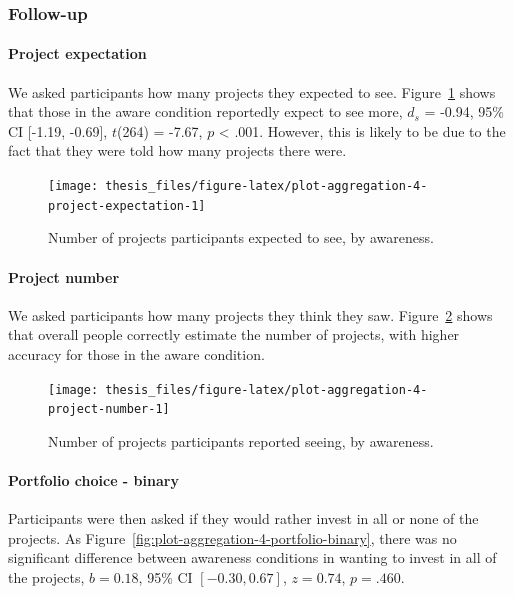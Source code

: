 \documentclass[a4paper, nobind, dvipsnames]{templates/ociamthesis}
\theoremstyle{definition}
\theoremstyle{definition}
\theoremstyle{definition}
\theoremstyle{definition}
\theoremstyle{remark}
\begin{document}
\subsubsection{Follow-up}

\paragraph{Project expectation}

We asked participants how many projects they expected to see.
Figure~\ref{fig:plot-aggregation-4-project-expectation} shows that those in
the aware condition reportedly expect to see more,
\(d_s\) = -0.94, 95\% CI {[}-1.19, -0.69{]}, \(t\)(264) = -7.67, \(p\) \textless{} .001. However, this is likely to be due to
the fact that they were told how many projects there were.



\begin{figure}
\texttt{[image: thesis\_files/figure-latex/plot-aggregation-4-project-expectation-1]} \caption{Number of projects participants expected to see, by awareness.}\label{fig:plot-aggregation-4-project-expectation}
\end{figure}

\paragraph{Project number}

We asked participants how many projects they think they saw.
Figure~\ref{fig:plot-aggregation-4-project-number} shows that overall people
correctly estimate the number of projects, with higher accuracy for those in the
aware condition.



\begin{figure}
\texttt{[image: thesis\_files/figure-latex/plot-aggregation-4-project-number-1]} \caption{Number of projects participants reported seeing, by awareness.}\label{fig:plot-aggregation-4-project-number}
\end{figure}

\paragraph{Portfolio choice - binary}

Participants were then asked if they would rather invest in all or none of the
projects. As Figure~\ref{fig:plot-aggregation-4-portfolio-binary}, there was no
significant difference between awareness conditions in wanting to invest
in all of the projects,
\(b = 0.18\), 95\% CI \([-0.30, 0.67]\), \(z = 0.74\), \(p = .460\).
\end{document}
